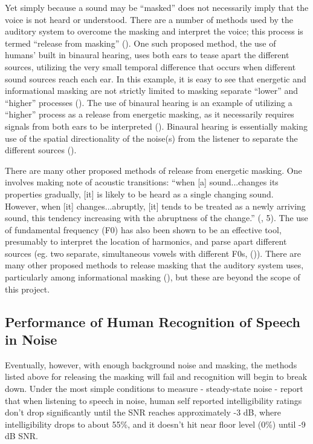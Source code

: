 \documentclass[dissertation,copyright]{uathesis}
\begin{document}
Yet simply because a sound may be ``masked'' does not necessarily imply that the voice is not heard or understood.  There are a number of methods used by the auditory system to overcome the masking and interpret the voice; this process is termed ``release from masking'' (\cite{middlebrooks:17}).  One such proposed method, the use of humans' built in binaural hearing, uses both ears to tease apart the different sources, utilizing the very small temporal difference that occurs when different sound sources reach each ear.  
In this example, it is easy to see that energetic and informational masking are not strictly limited to masking separate ``lower'' and ``higher'' processes (\cite{durlach:06}).
The use of binaural hearing is an example of utilizing a ``higher'' process as a release from energetic masking, as it necessarily requires signals from both ears to be interpreted (\cite{hirsh:48}). Binaural hearing is essentially making use of the spatial directionality of the noise(s) from the listener to separate the different sources (\cite{bregman:94}).

There are many other proposed methods of release from energetic masking. One involves making note of acoustic transitions: ``when [a] sound...changes its properties gradually, [it] is likely to be heard as a single changing sound.  However, when [it] changes...abruptly, [it] tends to be treated as a newly arriving sound, this tendency increasing with the abruptness of the change.'' (\cite{bregman:94}, 5).  The use of fundamental frequency (F0) has also been shown to be an effective tool, presumably to interpret the location of harmonics, and parse apart different sources (eg. two separate, simultaneous vowels with different F0s, (\cite{bird:97})). There are many other proposed methods to release masking that the auditory system uses, particularly among informational masking (\cite{middlebrooks:17}), but these are beyond the scope of this project.


\subsection{Performance of Human Recognition of Speech in Noise}

Eventually, however, with enough background noise and masking, the methods listed above for releasing the masking will fail and recognition will begin to break down.  Under the most simple conditions to measure - steady-state noise - \cite{ding:13} report that when listening to speech in noise, human self reported intelligibility ratings don't drop significantly until the SNR reaches approximately -3 dB, where intelligibility drops to about 55\%, and it doesn't hit near floor level (0\%) until -9 dB SNR.
\end{document}
